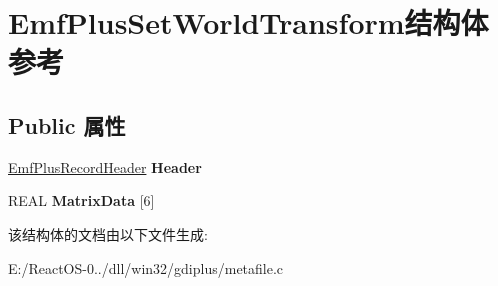 \hypertarget{struct_emf_plus_set_world_transform}{}\section{Emf\+Plus\+Set\+World\+Transform结构体 参考}
\label{struct_emf_plus_set_world_transform}
\subsection*{Public 属性}
\begin{DoxyCompactItemize}
\item 
\mbox{\label{struct_emf_plus_set_world_transform_a810e0174460a638174e0a8f1b67f0208}} 
\hyperlink{struct_emf_plus_record_header}{Emf\+Plus\+Record\+Header} {\bfseries Header}
\item 
\mbox{\label{struct_emf_plus_set_world_transform_a24de1568dacf2ea0ba48fa643e864649}} 
R\+E\+AL {\bfseries Matrix\+Data} \mbox{[}6\mbox{]}
\end{DoxyCompactItemize}


该结构体的文档由以下文件生成\+:\begin{DoxyCompactItemize}
\item 
E\+:/\+React\+O\+S-\/0../dll/win32/gdiplus/metafile.\+c\end{DoxyCompactItemize}
